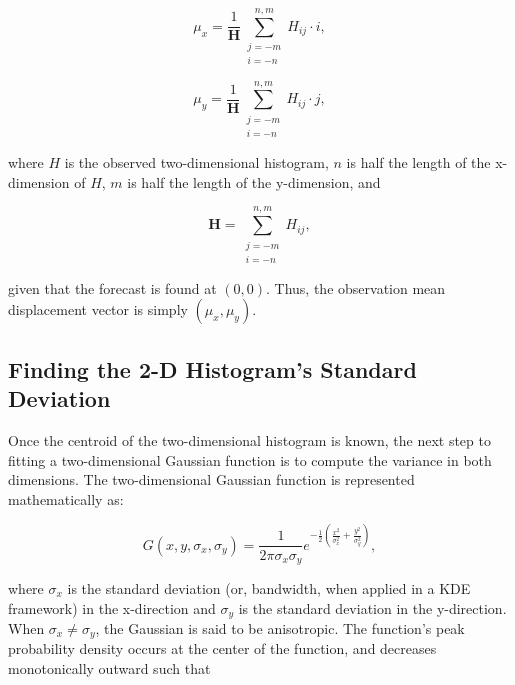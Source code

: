     \begin{equation}
        \label{mux}
        \mu_x = \frac{1}{\mathbf{H}} \sum\limits_{\substack{j=-m \\ i=-n}}^{n,m}H_{ij} \cdot i,
    \end{equation}

    \begin{equation}
        \label{muy}
        \mu_y = \frac{1}{\mathbf{H}} \sum\limits_{\substack{j=-m \\ i=-n}}^{n,m}H_{ij} \cdot j,
    \end{equation}

\noindent where $H$ is the observed two-dimensional histogram, $n$ is half the length of the x-dimension of $H$, $m$ is half the length of the y-dimension, and

    \begin{equation}
        \mathbf{H} = \sum\limits_{\substack{j=-m \\ i=-n}}^{n,m} H_{ij},
    \end{equation}

\noindent given that the forecast is found at $(0, 0)$. Thus, the observation mean displacement vector is simply $(\mu_x, \mu_y)$.




\subsection{Finding the 2-D Histogram's Standard Deviation}
\label{std}

Once the centroid of the two-dimensional histogram is known, the next step to fitting a two-dimensional Gaussian function is to compute the variance in both dimensions. The two-dimensional Gaussian function is represented mathematically as:

    \begin{equation}
        \label{2DGauss}
        G(x, y, \sigma_x, \sigma_y) = \frac{1}{2 \pi \sigma_x \sigma_y} e^{- \frac{1}{2} \left( \frac{x^2}{\sigma_x^2} + \frac{y^2}{\sigma_y^2} \right)},
    \end{equation}

\noindent where $\sigma_x$ is the standard deviation (or, bandwidth, when applied in a KDE framework) in the x-direction and $\sigma_y$ is the standard deviation in the y-direction. When $\sigma_x \neq \sigma_y$, the Gaussian is said to be anisotropic. The function's peak probability density occurs at the center of the function, and decreases monotonically outward such that

